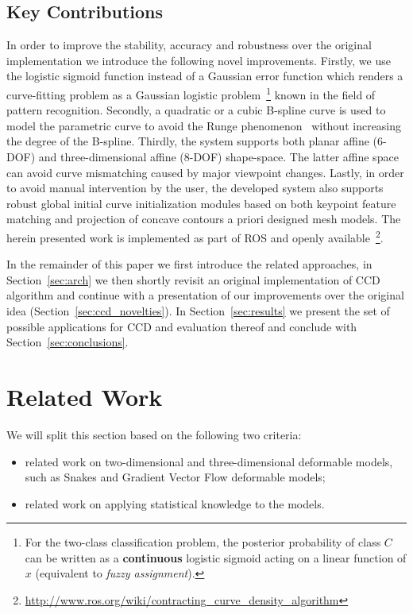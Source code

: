 \documentclass[conference]{IEEEtran}
\begin{document}

\subsection{Key Contributions}
In order to improve the stability, accuracy and robustness over the original
implementation we introduce the following novel improvements. Firstly, we use 
the logistic sigmoid function instead of a Gaussian error function which renders a
curve-fitting problem as a Gaussian logistic problem~\footnote{For the two-class
classification problem, the posterior probability 
of class $C$ can be written as a \textbf{continuous} logistic sigmoid acting
on a linear function of $x$ (equivalent to \textit{fuzzy assignment}).} known in the field of pattern 
recognition. Secondly, a quadratic or
a cubic B-spline curve is used to model the parametric curve
to avoid the Runge phenomenon~\cite{süli2003introduction} without increasing the degree of the
B-spline. Thirdly, the system supports both planar affine (6-DOF) and
three-dimensional affine (8-DOF) shape-space. The latter affine space can avoid
curve mismatching caused by major viewpoint changes. Lastly, in
order to avoid manual intervention by the user, the developed system
also supports robust global initial curve initialization modules based on both keypoint
feature matching and projection of concave contours a priori designed mesh models.
The herein presented work is implemented as part of ROS and openly 
available~\footnote{\url{http://www.ros.org/wiki/contracting_curve_density_algorithm}}.

In the remainder of this paper we first introduce the related approaches, 
in Section~\ref{sec:arch} we then shortly revisit an original implementation of 
CCD algorithm and continue with a presentation of our improvements over the
original idea (Section~\ref{sec:ccd_novelties}). In Section~\ref{sec:results}
we present the set of possible applications for CCD and evaluation thereof and
conclude with Section~\ref{sec:conclusions}.

\section{Related Work}
\label{sec:rw}
We will split this section based on the following two criteria:
\begin{itemize}
\item related work on two-dimensional and three-dimensional deformable models,
  such as Snakes and Gradient Vector Flow deformable models;
\item related work on applying statistical knowledge to the models.
\end{itemize}
\end{document}
